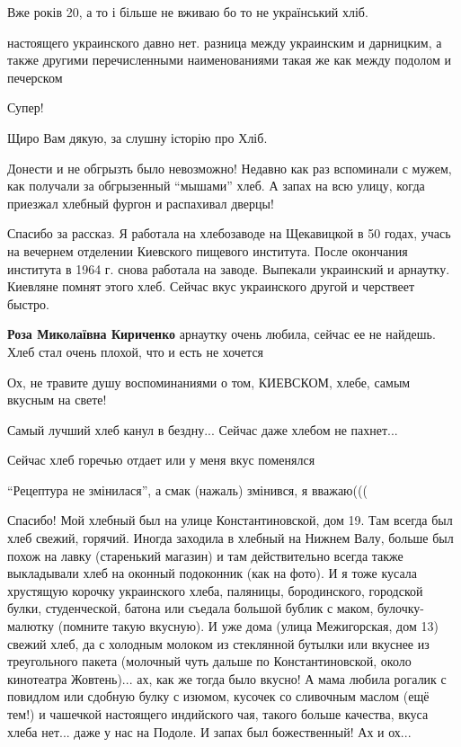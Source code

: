 \begin{itemize}
Вже років 20, а то і більше не вживаю бо то не український хліб.


настоящего украинского давно нет. разница между украинским и дарницким, а также
другими перечисленными наименованиями такая же как между подолом и печерском

Супер!

Щиро Вам дякую, за слушну історію про Хліб.


Донести и не обгрызть было невозможно! Недавно как раз вспоминали с мужем, как
получали за обгрызенный \enquote{мышами} хлеб. А запах на всю улицу, когда приезжал
хлебный фургон и распахивал дверцы!


Спасибо за рассказ. Я работала на хлебозаводе на Щекавицкой в 50 годах, учась
на вечернем отделении Киевского пищевого института. После окончания института в
1964 г. снова работала на заводе. Выпекали украинский и арнаутку. Киевляне
помнят этого хлеб. Сейчас вкус украинского другой и черствеет быстро.

\begin{itemize} %
\textbf{Роза Миколаївна Кириченко} арнаутку очень любила, сейчас ее не найдешь. Хлеб стал очень плохой, что и есть не хочется
\end{itemize} %

Ох, не травите душу воспоминаниями о том, КИЕВСКОМ, хлебе, самым вкусным на свете!

Самый лучший хлеб канул в бездну... Сейчас даже хлебом не пахнет...

Сейчас хлеб горечью отдает или у меня вкус поменялся

\enquote{Рецептура не змінилася}, а смак (нажаль) змінився, я вважаю(((


Спасибо! Мой хлебный был на улице Константиновской, дом 19. Там всегда был хлеб
свежий, горячий. Иногда заходила в хлебный на Нижнем Валу, больше был похож на
лавку (старенький магазин) и там действительно всегда также выкладывали хлеб на
оконный подоконник (как на фото). И я тоже кусала хрустящую корочку украинского
хлеба, паляницы, бородинского, городской булки, студенческой, батона или
съедала большой бублик с маком, булочку-малютку (помните такую вкусную). И уже
дома (улица Межигорская, дом 13) свежий хлеб, да с холодным молоком из
стеклянной бутылки или вкуснее из треугольного пакета (молочный чуть дальше по
Константиновской, около кинотеатра Жовтень)... ах, как же тогда было вкусно! А
мама любила рогалик с повидлом или сдобную булку с изюмом, кусочек со сливочным
маслом (ещё тем!) и чашечкой настоящего индийского чая, такого больше качества,
вкуса хлеба нет... даже у нас на Подоле. И запах был божественный! Ах и ох...



\end{itemize}
